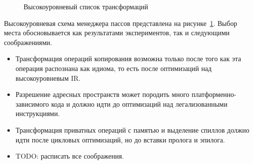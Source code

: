 \begin{figure}[ht]
    \caption{Высокоуровневый список трансформаций}\label{fig:highlevel-mgr}
\end{figure}

Высокоуровневая схема менеджера пассов представлена на рисунке~\cref{fig:highlevel-mgr}. Выбор места обосновывается как результатами экспериментов, так и следующими соображениями.

\begin{itemize}
\item Трансформация операций копирования возможна только после того как эта операция распознана как идиома, то есть после оптимизаций над высокоуровневым IR.
\item Разрешение адресных пространств может породить много платформенно-зависимого кода и должно идти до оптимизаций над легализованными инструкциями.
\item Трансформация приватных операций с памятью и выделение спиллов должно идти после цикловых оптимизаций, но до вставки пролога и эпилога.
\item TODO: расписать все соображения.
\end{itemize}

